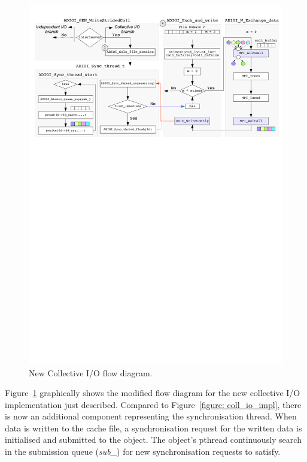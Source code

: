 \begin{figure}[!htb]
  \centering
  \includegraphics[width=\textwidth]{chapters/chapter3/figures/ext2ph+e10}
  \caption{New Collective I/O flow diagram.}
  \label{figure: new_coll_io_impl}
\end{figure}

Figure~\ref{figure: new_coll_io_impl} graphically shows the modified flow diagram for the new collective I/O implementation just described. Compared to Figure~\ref{figure: coll_io_impl}, there is now an additional component representing the synchronisation thread. 
When data is written to the cache file, a synchronisation request for the written data is initialised and submitted to the  object. The object's pthread continuously search in the submission queue (\textit{sub\_}) for new 
synchronisation requests to satisfy.

